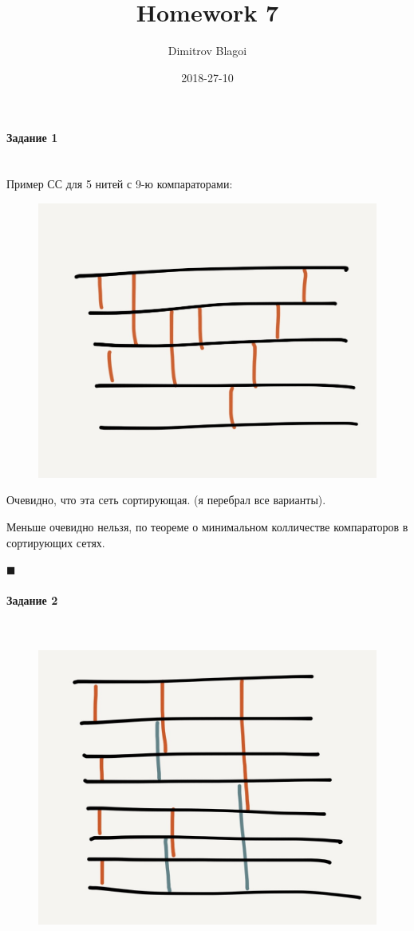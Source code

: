 \documentclass{article}
\title{Homework 7}
\date{2018-27-10}
\author{Dimitrov Blagoi}
\newcommand{\myparagraph}[1]{\paragraph{#1}\mbox{}\\}
\begin{document}
  \maketitle
  \newpage

  \newpage

  \myparagraph{Задание 1}
  Пример СС для 5 нитей с 9-ю компараторами:

  \begin{figure}[h!]
    \centering
    \includegraphics[width = 0.8\linewidth]{Pictures/Picture1.jpg}
  \end{figure}

  Очевидно, что эта сеть сортирующая. (я перебрал все варианты).

  Меньше очевидно нельзя, по теореме о минимальном колличестве компараторов в сортирующих сетях.

  \begin{flushright}
    $\blacksquare$
  \end{flushright}

  \newpage

  \myparagraph{Задание 2}
  \begin{figure}[h!]
    \centering
    \includegraphics[width = 0.8\linewidth]{Pictures/Picture2.jpg}
  \end{figure}
\end{document}
